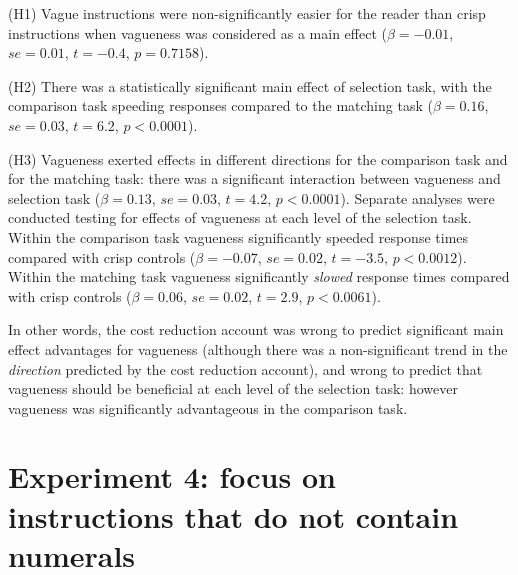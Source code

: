 \documentclass[%
man,		%
floatsintext,%
apacite%
]{apa6} %
\begin{document}
{\small
\begin{APAenumerate}
	\item [(H1)] Vague instructions were non-significantly easier for the reader than crisp instructions when vagueness was considered as a main effect ($\beta=-0.01$, $se=0.01$, $t=-0.4$, $p=0.7158$). 
	\item [(H2)] There was a statistically significant main effect of selection task, with the comparison task speeding responses compared to the matching task ($\beta=0.16$, $se=0.03$, $t=6.2$, $p<0.0001$). 
	\item [(H3)] Vagueness exerted effects in different directions for the comparison task and for the matching task: there was a significant interaction between vagueness and selection task ($\beta=0.13$, $se=0.03$, $t=4.2$, $p<0.0001$). 
Separate analyses were conducted testing for effects of vagueness at each level of the selection task.
Within the comparison task vagueness significantly speeded response times compared with crisp controls ($\beta=-0.07$, $se=0.02$, $t=-3.5$, $p<0.0012$). 
Within the matching task vagueness significantly \emph{slowed} response times compared with crisp controls ($\beta=0.06$, $se=0.02$, $t=2.9$, $p<0.0061$). 
\end{APAenumerate}
}
In other words, the cost reduction account was wrong to predict significant main effect advantages for vagueness (although there was a non-significant trend in the \emph{direction} predicted by the cost reduction account), and wrong to predict that vagueness should be beneficial at each level of the selection task: however vagueness was significantly advantageous in the comparison task.


\section{Experiment 4: focus on instructions that do not contain numerals} %
\end{document}
